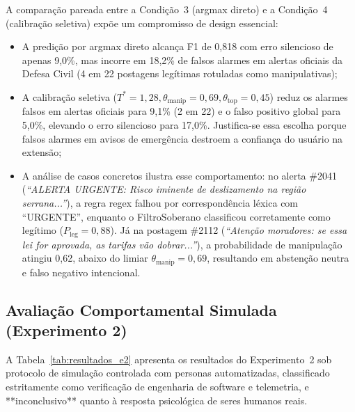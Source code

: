 \documentclass[runningheads]{llncs}
\begin{document}
A comparação pareada entre a Condição~3 (argmax direto) e a Condição~4 (calibração seletiva) expõe um compromisso de design essencial:
\begin{itemize}
    \item A predição por argmax direto alcança F1 de 0,818 com erro silencioso de apenas 9,0\%, mas incorre em 18,2\% de falsos alarmes em alertas oficiais da Defesa Civil (4 em 22 postagens legítimas rotuladas como manipulativas);
    \item A calibração seletiva ($T^*=1{,}28, \theta_{\text{manip}}=0{,}69, \theta_{\text{top}}=0{,}45$) reduz os alarmes falsos em alertas oficiais para 9,1\% (2 em 22) e o falso positivo global para 5,0\%, elevando o erro silencioso para 17,0\%. Justifica-se essa escolha porque falsos alarmes em avisos de emergência destroem a confiança do usuário na extensão;
    \item A análise de casos concretos ilustra esse comportamento: no alerta \#2041 (\textit{``ALERTA URGENTE: Risco iminente de deslizamento na região serrana...''}), a regra regex falhou por correspondência léxica com ``URGENTE'', enquanto o FiltroSoberano classificou corretamente como legítimo ($P_{\text{leg}}=0{,}88$). Já na postagem \#2112 (\textit{``Atenção moradores: se essa lei for aprovada, as tarifas vão dobrar...''}), a probabilidade de manipulação atingiu 0,62, abaixo do limiar $\theta_{\text{manip}}=0{,}69$, resultando em abstenção neutra e falso negativo intencional.
\end{itemize}

\subsection{Avaliação Comportamental Simulada (Experimento 2)}

A Tabela~\ref{tab:resultados_e2} apresenta os resultados do Experimento~2 sob protocolo de simulação controlada com personas automatizadas, classificado estritamente como verificação de engenharia de software e telemetria, e **inconclusivo** quanto à resposta psicológica de seres humanos reais.
\end{document}
